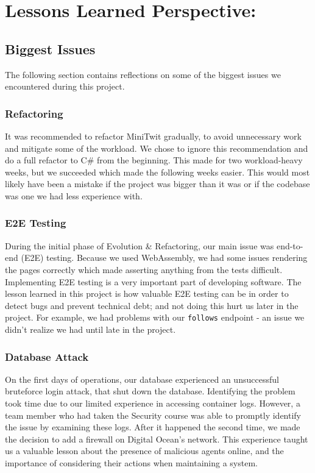 \section{Lessons Learned Perspective:}

\subsection{Biggest Issues}
The following section contains reflections on some of the biggest issues we encountered during this project.

\subsubsection{Refactoring}
It was recommended to refactor MiniTwit gradually, to avoid unnecessary work and mitigate some of the workload. We chose to ignore this recommendation and do a full refactor to C\# from the beginning. This made for two workload-heavy weeks, but we succeeded which made the following weeks easier. This would most likely have been a mistake if the project was bigger than it was or if the codebase was one we had less experience with.

\subsubsection{E2E Testing}
During the initial phase of Evolution \& Refactoring, our main issue was end-to-end (E2E) testing. Because we used WebAssembly, we had some issues rendering the pages correctly which made asserting anything from the tests difficult. Implementing E2E testing is a very important part of developing software. The lesson learned in this project is how valuable E2E testing can be in order to detect bugs and prevent technical debt; and not doing this hurt us later in the project. For example, we had problems with our \texttt{follows} endpoint - an issue we didn't realize we had until late in the project.

\subsubsection{Database Attack}
On the first days of operations, our database experienced an unsuccessful bruteforce login attack, that shut down the database. Identifying the problem took time due to our limited experience in accessing container logs.  However, a team member who had taken the Security course was able to promptly identify the issue by examining these logs. After it happened the second time, we made the decision to add a firewall on Digital Ocean's network. This experience taught us a valuable lesson about the presence of malicious agents online, and the importance of considering their actions when maintaining a system.


